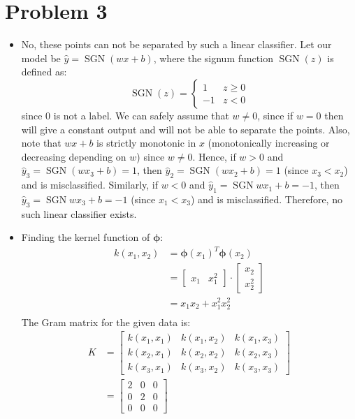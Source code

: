 \documentclass{article}
\newcommand{\mbi}[1]{\boldsymbol{#1}}
\DeclareMathOperator{\sgn}{SGN}
\begin{document}
\section{Problem 3}
  \begin{itemize}
    \item[\textbf{3.1}] No, these points can not be separated by such a linear classifier.
    Let our model be $\hat{y} = \sgn(wx + b)$, where the signum function $\sgn(z)$ is defined as:
    \[ \sgn(z) = \begin{cases}
      1 & z \ge 0 \\
      -1 & z < 0
    \end{cases} \]
    since 0 is not a label.
    We can safely assume that $w \ne 0$, since if $w = 0$ then will give a constant output and will not be able to separate the points.
    Also, note that $wx + b$ is strictly monotonic in $x$ (monotonically increasing or decreasing depending on $w$) since $w \ne 0$.
    Hence, if $w > 0$ and $\hat{y}_3 = \sgn(wx_3 + b) = 1$, then $\hat{y}_2 = \sgn(wx_2 + b) = 1$ (since $x_3 < x_2$) and is misclassified.
    Similarly, if $w < 0$ and $\hat{y}_1 = \sgn{wx_1 + b} = -1$, then $\hat{y}_3 = \sgn{wx_3 + b} = -1$ (since $x_1 < x_3$) and is misclassified.
    Therefore, no such linear classifier exists.

    \item[\textbf{3.2}] Finding the kernel function of $\mbi{\phi}$:
    \begin{align*}
      k(x_1, x_2) &= \mbi{\phi}(x_1)^T \mbi{\phi}(x_2) \\
      &= \begin{bmatrix}
        x_1 & x_1^2
      \end{bmatrix}
      \cdot
      \begin{bmatrix}
        x_2 \\
        x_2^2
      \end{bmatrix} \\
      &= x_1x_2 + x_1^2x_2^2 \\
    \end{align*}
    The Gram matrix for the given data is:
    \begin{align*}
      K &= \begin{bmatrix}
        k(x_1, x_1) & k(x_1, x_2) & k(x_1, x_3) \\
        k(x_2, x_1) & k(x_2, x_2) & k(x_2, x_3) \\
        k(x_3, x_1) & k(x_3, x_2) & k(x_3, x_3)
      \end{bmatrix} \\
      &= \begin{bmatrix}
        2 & 0 & 0 \\
        0 & 2 & 0 \\
        0 & 0 & 0
      \end{bmatrix}
    \end{align*}


\end{itemize}
\end{document}
